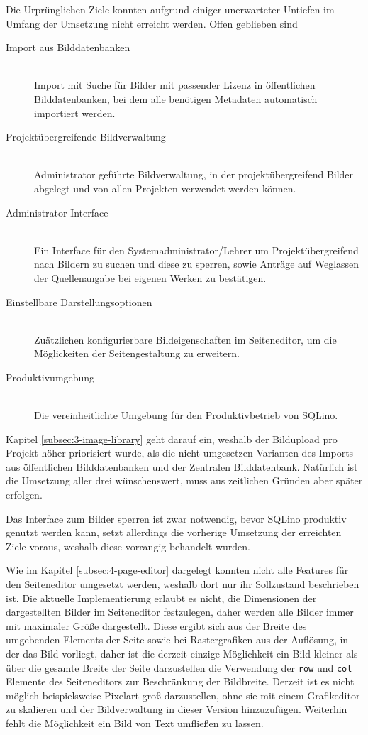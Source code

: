 Die Urprünglichen Ziele konnten aufgrund einiger unerwarteter Untiefen im Umfang
der Umsetzung nicht erreicht werden. Offen geblieben sind
\begin{description}
  \item[Import aus Bilddatenbanken] \mbox{} \\ Import mit Suche für Bilder mit
    passender Lizenz in öffentlichen Bilddatenbanken, bei dem alle benötigen
    Metadaten automatisch importiert werden.
  \item[Projektübergreifende Bildverwaltung] \mbox{} \\ Administrator geführte
    Bildverwaltung, in der projektübergreifend Bilder abgelegt und von allen
    Projekten verwendet werden können.
  \item[Administrator Interface] \mbox{} \\ Ein Interface für den
    Systemadministrator/Lehrer um Projektübergreifend nach Bildern zu suchen und
    diese zu sperren, sowie Anträge auf Weglassen der Quellenangabe bei eigenen
    Werken zu bestätigen.
  \item[Einstellbare Darstellungsoptionen] \mbox{} \\ Zuätzlichen
    konfigurierbare Bildeigenschaften im Seiteneditor, um die Möglickeiten der
    Seitengestaltung zu erweitern.
  \item[Produktivumgebung] \mbox{} \\ Die vereinheitlichte Umgebung für den
    Produktivbetrieb von SQLino.
\end{description}

Kapitel \ref{subsec:3-image-library} geht darauf ein, weshalb der Bildupload pro
Projekt höher priorisiert wurde, als die nicht umgesetzen Varianten des Imports
aus öffentlichen Bilddatenbanken und der Zentralen Bilddatenbank. Natürlich ist
die Umsetzung aller drei wünschenswert, muss aus zeitlichen Gründen aber später
erfolgen.

Das Interface zum Bilder sperren ist zwar notwendig, bevor SQLino produktiv
genutzt werden kann, setzt allerdings die vorherige Umsetzung der erreichten
Ziele voraus, weshalb diese vorrangig behandelt wurden.

Wie im Kapitel \ref{subsec:4-page-editor} dargelegt konnten nicht alle Features für
den Seiteneditor umgesetzt werden, weshalb dort nur ihr Sollzustand beschrieben
ist. Die aktuelle Implementierung erlaubt es nicht, die Dimensionen der
dargestellten Bilder im Seiteneditor festzulegen, daher werden alle Bilder immer
mit maximaler Größe dargestellt. Diese ergibt sich aus der Breite des umgebenden
Elements der Seite sowie bei Rastergrafiken aus der Auflösung, in der das Bild
vorliegt, daher ist die derzeit einzige Möglichkeit ein Bild kleiner als über
die gesamte Breite der Seite darzustellen die Verwendung der \texttt{row} und
\texttt{col} Elemente des Seiteneditors zur Beschränkung der Bildbreite. Derzeit
ist es nicht möglich beispielsweise Pixelart groß darzustellen, ohne sie mit
einem Grafikeditor zu skalieren und der Bildverwaltung in dieser Version
hinzuzufügen. Weiterhin fehlt die Möglichkeit ein Bild von Text umfließen zu
lassen.

